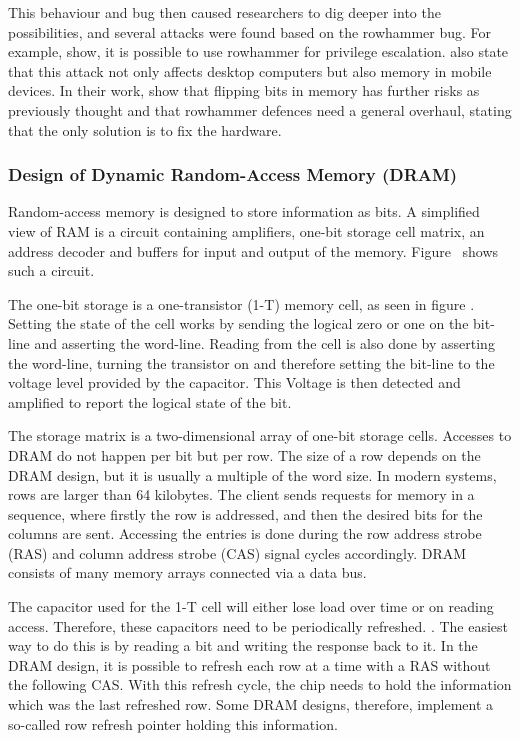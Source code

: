 This behaviour and bug then caused researchers to dig deeper into the
possibilities, and several attacks were found based on the rowhammer bug. For
example,  show, it is possible
to use rowhammer for privilege escalation.  also state
that this attack not only affects desktop computers but also memory in mobile
devices. In their work,  show that
flipping bits in memory has further risks as previously thought and that
rowhammer defences need a general overhaul, stating that the only solution is to
fix the hardware.

\subsubsection{Design of Dynamic Random-Access Memory (DRAM)}

Random-access memory is designed to store information as bits. A simplified view
of RAM is a circuit containing amplifiers, one-bit storage cell matrix, an
address decoder and buffers for input and output of the memory.
Figure~ shows such a circuit.

The one-bit storage is a one-transistor (1-T) memory cell, as seen in figure
. Setting the state of the cell works by sending the logical
zero or one on the bit-line and asserting the word-line. Reading from the cell
is also done by asserting the word-line, turning the transistor on and therefore
setting the bit-line to the voltage level provided by the capacitor. This
Voltage is then detected and amplified to report the logical state of the bit.

The storage matrix is a two-dimensional array of one-bit storage cells. Accesses
to DRAM do not happen per bit but per row. The size of a row depends on the DRAM
design, but it is usually a multiple of the word size. In modern systems, rows
are larger than 64 kilobytes.  The client sends
requests for memory in a sequence, where firstly the row is addressed, and then
the desired bits for the columns are sent. Accessing the entries is done during
the row address strobe (RAS) and column address strobe (CAS) signal cycles
accordingly. DRAM consists of many memory arrays connected via a data bus.

The capacitor used for the 1-T cell will either lose load over time or on
reading access. Therefore, these capacitors need to be periodically refreshed.
. The easiest way to do this is by reading a
bit and writing the response back to it. In the DRAM design, it is possible to
refresh each row at a time with a RAS without the following CAS. With this
refresh cycle, the chip needs to hold the information which was the last
refreshed row. Some DRAM designs, therefore, implement a so-called row refresh
pointer holding this information.

